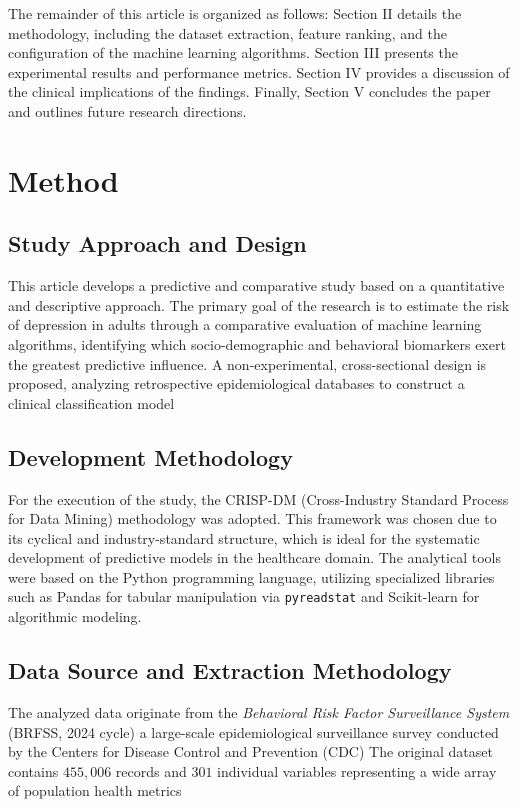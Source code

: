\documentclass[conference]{IEEEtran}
\begin{document}
The remainder of this article is organized as follows: Section II details the methodology, including the dataset extraction, feature ranking, and the configuration of the machine learning algorithms. Section III presents the experimental results and performance metrics. Section IV provides a discussion of the clinical implications of the findings. Finally, Section V concludes the paper and outlines future research directions.

\section{Method}

\subsection{Study Approach and Design}
This article develops a predictive and comparative study based on a quantitative and descriptive approach. The primary goal of the research is to estimate the risk of depression in adults through a comparative evaluation of machine learning algorithms, identifying which socio-demographic and behavioral biomarkers exert the greatest predictive influence. A non-experimental, cross-sectional design is proposed, analyzing retrospective epidemiological databases to construct a clinical classification model \cite{sokolov_decoding_2024} %

\subsection{Development Methodology}
For the execution of the study, the CRISP-DM (Cross-Industry Standard Process for Data Mining) methodology \cite{chapman2000crisp} %
was adopted. This framework was chosen due to its cyclical and industry-standard structure, which is ideal for the systematic development of predictive models in the healthcare domain. The analytical tools were based on the Python programming language, utilizing specialized libraries such as Pandas \cite{mckinney2010pandas} %
for tabular manipulation via \texttt{pyreadstat} %
and Scikit-learn \cite{scikit-learn} %
for algorithmic modeling.

\subsection{Data Source and Extraction Methodology}
The analyzed data originate from the \textit{Behavioral Risk Factor Surveillance System} (BRFSS, 2024 cycle) %
a large-scale epidemiological surveillance survey conducted by the Centers for Disease Control and Prevention (CDC) \cite{cdc2024brfss} %
The original dataset contains $455{,}006$ records and $301$ individual variables representing a wide array of population health metrics %
\end{document}
